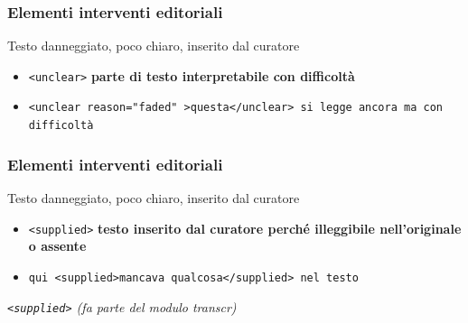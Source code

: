 \begin{frame}
    \frametitle{Elementi interventi editoriali}
    \addtocounter{nframe}{1}
    

    \begin{block}{Testo danneggiato, poco chiaro, inserito dal curatore}
        \begin{itemize}
            \item \texttt{<unclear>} \textbf{parte di testo interpretabile con difficoltà}
            \item[] \texttt{<unclear reason="faded" >questa</unclear> si legge
            ancora ma con difficoltà}
        \end{itemize}
        
    \end{block}
    
\end{frame}

\begin{frame}
    \frametitle{Elementi interventi editoriali}
    \addtocounter{nframe}{1}
    

    \begin{block}{Testo danneggiato, poco chiaro, inserito dal curatore}
        \begin{itemize}
            \item \texttt{<supplied>} \textbf{testo inserito dal curatore perché illeggibile nell’originale o assente}
            \item[] \texttt{qui <supplied>mancava qualcosa</supplied> nel testo}
        \end{itemize}
        
    \end{block}

    \textit{\texttt{<supplied>}  (fa parte del modulo transcr)}

\end{frame}


